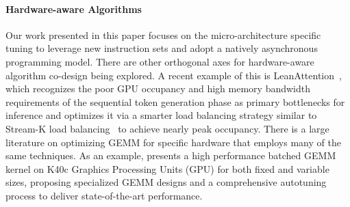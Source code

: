 \paragraph{Hardware-aware Algorithms}
Our work presented in this paper focuses on the micro-architecture
specific tuning to leverage new instruction sets and adopt a natively
asynchronous programming model. There are other orthogonal axes for
hardware-aware algorithm co-design being explored.
A recent example of this is LeanAttention~\citep{sanovar2024-leanattention},
which recognizes the poor GPU occupancy and high memory bandwidth requirements
of the sequential token generation phase as primary bottlenecks for inference
and optimizes it via a smarter load balancing strategy similar to Stream-K
load balancing~\citep{streamk} to achieve nearly peak occupancy.
There is a large literature on optimizing GEMM for specific hardware that employs
many of the same techniques.
As an example, \citet{abdel2016batched} presents a high performance batched GEMM kernel on
K40c Graphics Processing Units (GPU) for both fixed and variable sizes,
proposing specialized GEMM designs
and a comprehensive autotuning process to deliver state-of-the-art 
performance.

